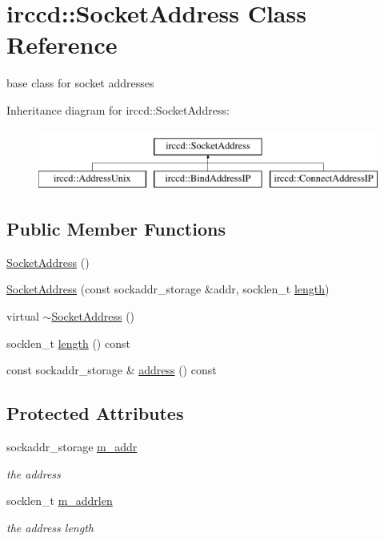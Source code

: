 \hypertarget{a00063}{\section{irccd\-:\-:Socket\-Address Class Reference}
\label{a00063}
}


base class for socket addresses  


Inheritance diagram for irccd\-:\-:Socket\-Address\-:\begin{figure}[H]
\begin{center}
\leavevmode
\includegraphics[height=2.000000cm]{a00063}
\end{center}
\end{figure}
\subsection*{Public Member Functions}
\begin{DoxyCompactItemize}
\item 
\hyperlink{a00063_a0f0b48957b1ad4f8da8e96650ec722d9}{Socket\-Address} ()
\item 
\hyperlink{a00063_a38552e36a03df761a342edcd9b89c1c9}{Socket\-Address} (const sockaddr\-\_\-storage \&addr, socklen\-\_\-t \hyperlink{a00063_a027f40cd4a3e045c586e59759a31a28b}{length})
\item 
virtual \hyperlink{a00063_a49b11a7e834a333550f4f9844ccee59f}{$\sim$\-Socket\-Address} ()
\item 
socklen\-\_\-t \hyperlink{a00063_a027f40cd4a3e045c586e59759a31a28b}{length} () const 
\item 
const sockaddr\-\_\-storage \& \hyperlink{a00063_aa0f134823245bd0a33b7bee4836753e3}{address} () const 
\end{DoxyCompactItemize}
\subsection*{Protected Attributes}
\begin{DoxyCompactItemize}
\item 
\hypertarget{a00063_a167cc57191f0ba8b0a5678ca5c7878bc}{sockaddr\-\_\-storage \hyperlink{a00063_a167cc57191f0ba8b0a5678ca5c7878bc}{m\-\_\-addr}}\label{a00063_a167cc57191f0ba8b0a5678ca5c7878bc}

\begin{DoxyCompactList}\small\item\em the address \end{DoxyCompactList}\item 
\hypertarget{a00063_ad7a206bc3ae4985a8fc83da148f033c5}{socklen\-\_\-t \hyperlink{a00063_ad7a206bc3ae4985a8fc83da148f033c5}{m\-\_\-addrlen}}\label{a00063_ad7a206bc3ae4985a8fc83da148f033c5}

\begin{DoxyCompactList}\small\item\em the address length \end{DoxyCompactList}\end{DoxyCompactItemize}

